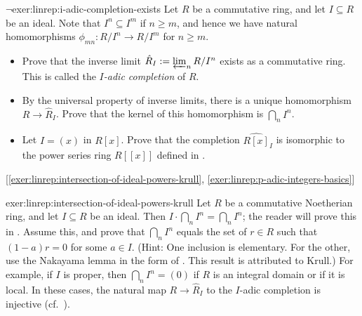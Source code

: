 \begin{exer}{$\lnot$}{exer:linrep:i-adic-completion-exists}
  Let $R$ be a commutative ring, and let $I \subseteq R$ be an ideal.
  Note that $I^n \subseteq I^m$ if $n \geq m$, and hence we have
  natural homomorphisms $\phi_{mn} : R/I^n \to R/I^m$ for $n \geq m$.
  \begin{itemize}
  \item Prove that the inverse limit
    $\hat{R}_I := \varprojlim_n R/I^n$ exists as a commutative
    ring. This is called the \emph{$I$-adic completion} of $R$.
  \item By the universal property of inverse limits, there is a unique
    homomorphism $R \to \hat{R}_I$. Prove that the kernel of this
    homomorphism is $\bigcap_n I^n$.
  \item Let $I = (x)$ in $R[x]$. Prove that the completion
    $\widehat{R[x]}_I$ is isomorphic to the power series ring $R[[x]]$
    defined in .
  \end{itemize} [\ref{exer:linrep:intersection-of-ideal-powers-krull},
  \ref{exer:linrep:p-adic-integers-basics}]
\end{exer}

\begin{exer}{}{exer:linrep:intersection-of-ideal-powers-krull}
  Let $R$ be a commutative Noetherian ring, and let $I \subseteq R$ be
  an ideal. Then $I \cdot \bigcap_n I^n = \bigcap_n I^n$; the reader
  will prove this in
  . Assume
  this, and prove that $\bigcap_n I^n$ equals the set of $r \in R$
  such that $(1-a)r = 0$ for some $a \in I$. (Hint: One inclusion is
  elementary. For the other, use the Nakayama lemma in the form of
  . This result is
  attributed to Krull.) For example, if $I$ is proper, then
  $\bigcap_n I^n = (0)$ if $R$ is an integral domain or if it is
  local.  In these cases, the natural map $R \to \hat{R}_I$ to the
  $I$-adic completion is injective (cf.\
  ).
\end{exer}

